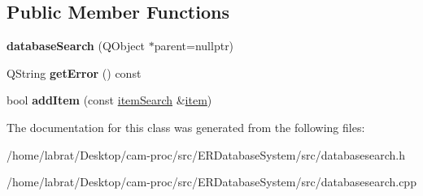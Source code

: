 \subsection*{Public Member Functions}
\begin{DoxyCompactItemize}
\item 
{\bfseries database\+Search} (Q\+Object $\ast$parent=nullptr)\hypertarget{classdatabaseSearch_aae8e0eccc5ea8b298c0898468e72b542}{}\label{classdatabaseSearch_aae8e0eccc5ea8b298c0898468e72b542}

\item 
Q\+String {\bfseries get\+Error} () const \hypertarget{classdatabaseSearch_a2591c168f976c214de6112280df05fe5}{}\label{classdatabaseSearch_a2591c168f976c214de6112280df05fe5}

\item 
bool {\bfseries add\+Item} (const \hyperlink{classitemSearch}{item\+Search} \&\hyperlink{classitem}{item})\hypertarget{classdatabaseSearch_a97c19d28a7180382f7ec6e9d357a4d7e}{}\label{classdatabaseSearch_a97c19d28a7180382f7ec6e9d357a4d7e}

\end{DoxyCompactItemize}


The documentation for this class was generated from the following files\+:\begin{DoxyCompactItemize}
\item 
/home/labrat/\+Desktop/cam-\/proc/src/\+E\+R\+Database\+System/src/databasesearch.\+h\item 
/home/labrat/\+Desktop/cam-\/proc/src/\+E\+R\+Database\+System/src/databasesearch.\+cpp\end{DoxyCompactItemize}
